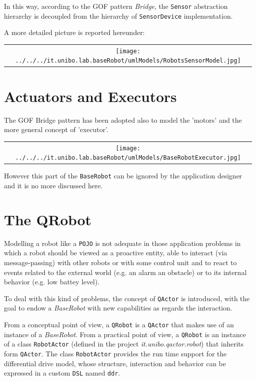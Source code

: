 In this way, according to the GOF pattern \textit{Bridge}, the \texttt{Sensor} abstraction hierarchy is decoupled from the hierarchy of \texttt{SensorDevice} implementation.



A more detailed picture is reported hereunder:
 
\begin{center}
\begin{tabular}{ c }
     \texttt{[image: ../../../it.unibo.lab.baseRobot/umlModels/RobotsSensorModel.jpg]}\\
\end{tabular} 
\end{center}



\section{Actuators and Executors}
 
The GOF Bridge pattern has been adopted also to model the 'motors' and the more general concept of 'executor'.

\begin{center}
\begin{tabular}{ c }
     \texttt{[image: ../../../it.unibo.lab.baseRobot/umlModels/BaseRobotExecutor.jpg]}\\
\end{tabular} 
\end{center}

However this part of the \texttt{BaseRobot} can be ignored by the application designer and it is no more discussed here.


\newpage 
\section{The QRobot }
Modelling a robot like a \texttt{POJO} is not adequate in those application problems in which a robot should be viewed as a proactive entity, able to interact (via message-passing) with other robots or with some control unit and to react to events related to the external world (e.g. an alarm an obstacle) or to its internal behavior (e.g. low battey level).

To deal with this kind of problems, the concept of \texttt{QActor} is introduced, with the goal to endow a \textit{BaseRobot} with new capabilities as regards the interaction.

From a conceptual point of view, a \texttt{QRobot} is a \texttt{QActor} that makes use of an instance of a \textit{BaseRobot}.
From a practical point of view, a \texttt{QRobot} is an instance of a class \texttt{RobotActor} (defined in the project \textit{it.unibo.qactor.robot}) that inherits form \texttt{QActor}. The class \texttt{RobotActor} provides the run time support for the differential drive model, whose structure, interaction and behavior can be expressed in a custom \texttt{DSL} named \texttt{ddr}.

